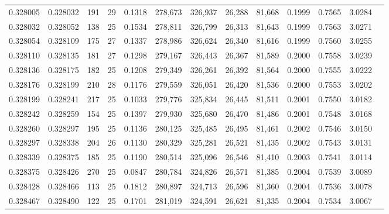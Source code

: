 \begin{tabular}{rrrrrrrrrrrrr}
0.328005 & 0.328032 &   191 &  29 &                                     0.1318 & 278,673 & 326,937 &  26,288 &  81,668 & 0.1999 & 0.7565 & 3.0284 \\
0.328032 & 0.328052 &   138 &  25 &                                     0.1534 & 278,811 & 326,799 &  26,313 &  81,643 & 0.1999 & 0.7563 & 3.0271 \\
0.328054 & 0.328109 &   175 &  27 &                                     0.1337 & 278,986 & 326,624 &  26,340 &  81,616 & 0.1999 & 0.7560 & 3.0255 \\
0.328110 & 0.328135 &   181 &  27 &                                     0.1298 & 279,167 & 326,443 &  26,367 &  81,589 & 0.2000 & 0.7558 & 3.0239 \\
0.328136 & 0.328175 &   182 &  25 &                                     0.1208 & 279,349 & 326,261 &  26,392 &  81,564 & 0.2000 & 0.7555 & 3.0222 \\
0.328176 & 0.328199 &   210 &  28 &                                     0.1176 & 279,559 & 326,051 &  26,420 &  81,536 & 0.2000 & 0.7553 & 3.0202 \\
0.328199 & 0.328241 &   217 &  25 &                                     0.1033 & 279,776 & 325,834 &  26,445 &  81,511 & 0.2001 & 0.7550 & 3.0182 \\
0.328242 & 0.328259 &   154 &  25 &                                     0.1397 & 279,930 & 325,680 &  26,470 &  81,486 & 0.2001 & 0.7548 & 3.0168 \\
0.328260 & 0.328297 &   195 &  25 &                                     0.1136 & 280,125 & 325,485 &  26,495 &  81,461 & 0.2002 & 0.7546 & 3.0150 \\
0.328297 & 0.328338 &   204 &  26 &                                     0.1130 & 280,329 & 325,281 &  26,521 &  81,435 & 0.2002 & 0.7543 & 3.0131 \\
0.328339 & 0.328375 &   185 &  25 &                                     0.1190 & 280,514 & 325,096 &  26,546 &  81,410 & 0.2003 & 0.7541 & 3.0114 \\
0.328375 & 0.328426 &   270 &  25 &                                     0.0847 & 280,784 & 324,826 &  26,571 &  81,385 & 0.2004 & 0.7539 & 3.0089 \\
0.328428 & 0.328466 &   113 &  25 &                                     0.1812 & 280,897 & 324,713 &  26,596 &  81,360 & 0.2004 & 0.7536 & 3.0078 \\
0.328467 & 0.328490 &   122 &  25 &                                     0.1701 & 281,019 & 324,591 &  26,621 &  81,335 & 0.2004 & 0.7534 & 3.0067 \\

\end{tabular}

